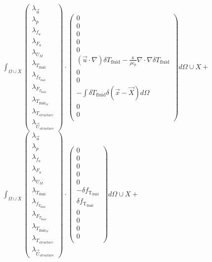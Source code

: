 \documentclass[10pt]{article} %
\begin{document}
\begin{center}
	$\int_{\Omega \cup X}
	\begin{pmatrix}
		\lambda_{\vec{u}} \\ \lambda_p \\ \lambda_{f_u} \\ \lambda_{F_u} \\ \lambda_{U_M}\\ \lambda_{T_{\text{fluid}}} \\ \lambda_{f_{T_{\text{fluid}}}} \\ \lambda_{F_{T_{\text{fluid}}}} \\ \lambda_{T_{\text{fluid}_M}} \\ \lambda_{T_{structure}} \\ \lambda_{\vec{U}_{structure}}
	\end{pmatrix}
	\cdot
	\begin{pmatrix}
		0 \\
		0\\
		0 \\
		0 \\
		0 \\
		(\vec{u} \cdot \nabla) \delta T_{\text{fluid}} - \frac{\kappa}{\rho c_p} \nabla \cdot \nabla \delta T_{\text{fluid}} \\
		0\\
		0\\
		-\int \delta T_{\text{fluid}} \delta (\vec{x}-\vec{X}) d\Omega\\
		0\\
		0\\
	\end{pmatrix}
	d\Omega \cup X + $\\

	$\int_{\Omega \cup X}
	\begin{pmatrix}
		\lambda_{\vec{u}} \\ \lambda_p \\ \lambda_{f_u} \\ \lambda_{F_u} \\ \lambda_{U_M}\\ \lambda_{T_{\text{fluid}}} \\ \lambda_{f_{T_{\text{fluid}}}} \\ \lambda_{F_{T_{\text{fluid}}}} \\ \lambda_{T_{\text{fluid}_M}} \\ \lambda_{T_{structure}} \\ \lambda_{\vec{U}_{structure}}
	\end{pmatrix}
	\cdot
	\begin{pmatrix}
		0 \\
		0\\
		0 \\
		0 \\
		0 \\
		-\delta f_{\text{T}_{\text{fluid}}} \\
		\delta f_{\text{T}_{\text{fluid}}}\\
		0\\
		0\\
		0\\
		0\\
	\end{pmatrix}
	d\Omega \cup X + $\\


\end{center}
\end{document}
